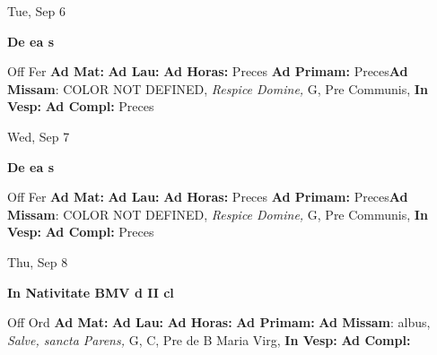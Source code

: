 \documentclass[10pt]{memoir}
\begin{document}
\begin{center}
\begin{minipage}{3.5in}
\vspace{2em}
\begin{center}Tue, Sep 6
\end{center}
\textbf{ \large De ea
\textnormal{\normalsize s}}

\begin{justify}Off Fer
\textbf{Ad Mat: }
\textbf{Ad Lau: }
\textbf{Ad Horas: }Preces
\textbf{Ad Primam: }Preces\textbf{Ad Missam}: COLOR NOT DEFINED, \textit{Respice Domine,} G, Pre Communis, 
\textbf{In Vesp: }
\textbf{Ad Compl: }Preces
\end{justify}
\end{minipage}
\end{center}

\begin{center}
\begin{minipage}{3.5in}
\vspace{2em}
\begin{center}Wed, Sep 7
\end{center}
\textbf{ \large De ea
\textnormal{\normalsize s}}

\begin{justify}Off Fer
\textbf{Ad Mat: }
\textbf{Ad Lau: }
\textbf{Ad Horas: }Preces
\textbf{Ad Primam: }Preces\textbf{Ad Missam}: COLOR NOT DEFINED, \textit{Respice Domine,} G, Pre Communis, 
\textbf{In Vesp: }
\textbf{Ad Compl: }Preces
\end{justify}
\end{minipage}
\end{center}

\begin{center}
\begin{minipage}{3.5in}
\vspace{2em}
\begin{center}Thu, Sep 8
\end{center}
\textbf{ \large In Nativitate BMV
\textnormal{\normalsize d II cl}}

\begin{justify}Off Ord
\textbf{Ad Mat: }
\textbf{Ad Lau: }
\textbf{Ad Horas: }
\textbf{Ad Primam: }\textbf{Ad Missam}: albus, \textit{Salve, sancta Parens,} G, C, Pre de B Maria Virg, 
\textbf{In Vesp: }
\textbf{Ad Compl: }
\end{justify}
\end{minipage}
\end{center}
\end{document}
